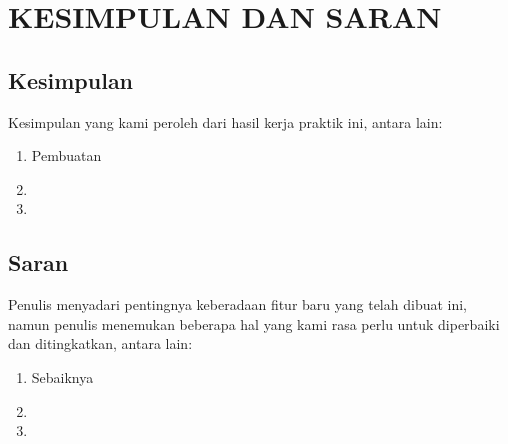 \chapter{KESIMPULAN DAN SARAN}
\vspace{4ex}

\setlength{\parindent}{7ex}


\section{Kesimpulan}
\vspace{1ex}

Kesimpulan yang kami peroleh dari hasil kerja praktik ini, antara lain:
\vspace{0.5ex}

\begin{enumerate}[nolistsep]

  \item Pembuatan \lipsum[1][1-2]
  \vspace{0.5ex}

  \item \lipsum[1][3-4]
  \vspace{0.5ex}

  \item \lipsum[1][5-6]
  \vspace{0.5ex}

\end{enumerate}
\vspace{0.5ex}

\section{Saran}
\vspace{1ex}

Penulis menyadari pentingnya keberadaan fitur baru yang telah dibuat ini, namun penulis menemukan beberapa hal yang kami rasa perlu untuk diperbaiki dan ditingkatkan, antara lain:
\vspace{0.5ex}

\begin{enumerate}[nolistsep]

  \item Sebaiknya \lipsum[1][1-2]
  \vspace{0.5ex}

  \item \lipsum[1][3-4]
  \vspace{0.5ex}

  \item \lipsum[1][5-6]
  \vspace{0.5ex}

\end{enumerate}
\vspace{0.5ex}